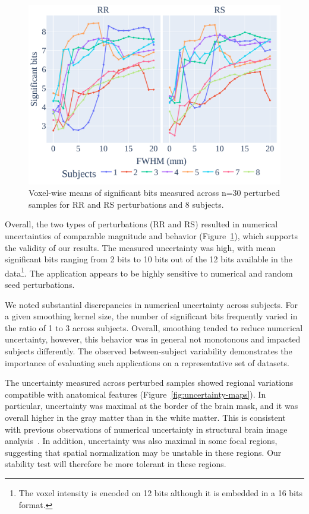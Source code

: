 \documentclass[lettersize,journal]{IEEEtran}
\begin{document}
\begin{figure}
    \centering
    \includegraphics[width=\linewidth]{figures/stats.pdf}
    \caption{Voxel-wise means of significant bits
        measured across n=30 perturbed samples for RR and RS perturbations and 8
        subjects.}
    \label{fig:significant-digits}
\end{figure}
Overall, the two types of perturbations (RR and RS) resulted in numerical uncertainties of comparable magnitude and behavior (Figure~\ref{fig:significant-digits}), which supports the validity of our results. The measured uncertainty was high, with mean significant bits ranging from 2 bits to 10 bits out of the 12 bits available in the data\footnote{The voxel intensity is encoded on 12 bits although it is embedded in a 16 bits format.}. The application appears to be highly sensitive to numerical and random seed perturbations.

We noted substantial discrepancies in numerical uncertainty across subjects. For a given smoothing kernel size, the number of significant bits frequently varied in the ratio of 1 to 3 across subjects. Overall, smoothing tended to reduce numerical uncertainty, however, this behavior was in general not monotonous and impacted subjects differently. The observed between-subject variability
demonstrates the importance of evaluating such applications on a representative set of datasets.

The uncertainty measured across perturbed samples showed regional variations compatible with anatomical features (Figure~\ref{fig:uncertainty-maps}). In particular, uncertainty was
maximal at the border of the brain mask, and it was overall higher in the gray matter than in the white matter.
This is consistent with previous observations of numerical uncertainty in structural brain image analysis~\cite{salari2021accurate}.
In addition, uncertainty was also maximal in some focal regions, suggesting that spatial normalization may be unstable in these regions. Our stability test will therefore be more tolerant in these regions.
\end{document}
